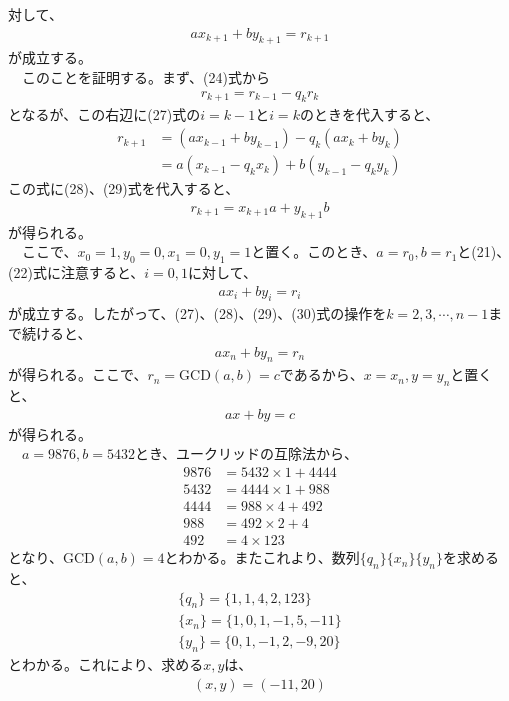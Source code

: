 \documentclass[a4paper,10.5pt]{ltjsarticle}
\begin{document}
対して、
\begin{align}
  ax_{k+1}+by_{k+1}=r_{k+1}
\end{align}
が成立する。\\
　このことを証明する。まず、(24)式から
\begin{align}
  r_{k+1}=r_{k-1}-q_kr_k\nonumber
\end{align}
となるが、この右辺に(27)式の$i=k-1$と$i=k$のときを代入すると、
\begin{align}
  r_{k+1}&=\left(ax_{k-1}+by_{k-1}\right)-q_k\left(ax_k+by_k\right)\nonumber\\
  &=a\left(x_{k-1}-q_kx_k\right)+b\left(y_{k-1}-q_ky_k\right)\nonumber
\end{align}
この式に(28)、(29)式を代入すると、
\begin{align}
  r_{k+1}=x_{k+1}a+y_{k+1}b\nonumber
\end{align}
が得られる。\\
　ここで、$x_0=1,y_0=0,x_1=0,y_1=1$と置く。このとき、$a=r_0,b=r_1$と(21)、(22)式に注意すると、$i=0,1$に対して、
\begin{align*}
  ax_i+by_i=r_i
\end{align*}
が成立する。したがって、(27)、(28)、(29)、(30)式の操作を$k=2,3,\cdots,n-1$まで続けると、
\begin{align*}
  ax_n+by_n=r_n
\end{align*}
が得られる。ここで、$r_n=\mathrm{GCD}(a,b)=c$であるから、$x=x_n,y=y_n$と置くと、
\begin{align*}
  ax+by=c
\end{align*}
が得られる。\\
　$a=9876,b=5432$とき、ユークリッドの互除法から、
\begin{align*}
  9876&=5432\times1+4444\\[5pt]
  5432&=4444\times1+988\\[5pt]
  4444&=988\times4+492\\[5pt]
  988&=492\times2+4\\[5pt]
  492&=4\times123
\end{align*}
となり、GCD$(a,b)=4$とわかる。またこれより、数列$\{q_n\}\{x_n\}\{y_n\}$を求めると、
\begin{align*}
  \{q_n\}=\{1,1,4,2,123\}\\[5pt]
  \{x_n\}=\{1,0,1,-1,5,-11\}\\[5pt]
  \{y_n\}=\{0,1,-1,2,-9,20\}
\end{align*}
とわかる。これにより、求める$x,y$は、
\begin{align*}
  (x,y)=(-11,20)
\end{align*}
\end{document}
